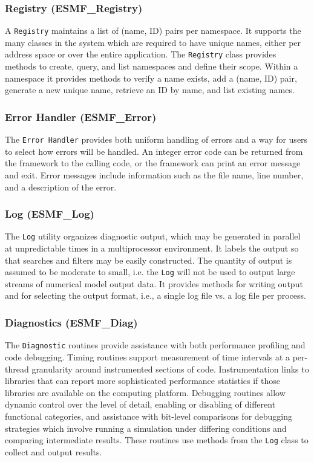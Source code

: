 \subsubsection{Registry (ESMF\_Registry)}
\label{sec:registry} 
A {\tt Registry} maintains a list of (name, ID) pairs per 
namespace.  It supports the many classes in the system which are
required to have unique names, either per address space or over the entire
application.  The {\tt Registry} class provides methods to
create, query, and list namespaces and define their scope.  
Within a namespace it provides methods to
verify a name exists, add a (name, ID) pair,
generate a new unique name, retrieve an ID by name, 
and list existing names.

\subsubsection{Error Handler (ESMF\_Error)}
\label{sec:error} 
The {\tt Error Handler} provides both uniform handling of errors and
a way for users to select how errors will be handled.
An integer error code can be returned from the framework to the
calling code, or the framework can print an error message and exit.
Error messages include information such as the file name, line number, 
and a description of the error.

\subsubsection{Log (ESMF\_Log)}
\label{sec:log} 
The {\tt Log} utility organizes diagnostic output, 
which may be generated in parallel at unpredictable times in
a multiprocessor environment.  It labels the output so that 
searches and filters may be easily constructed.  The quantity of
output is assumed to be moderate to small, i.e. the {\tt Log} 
will not be used to output large streams of numerical model output data.  
It provides methods for writing output and for selecting the
output format, i.e., a single log file vs. a log file per process.

\subsubsection{Diagnostics (ESMF\_Diag)}
\label{sec:diagnostics} 
The {\tt Diagnostic} routines provide assistance with both performance
profiling and code debugging.  Timing routines support measurement
of time intervals at a per-thread granularity around instrumented
sections of code.  Instrumentation links to libraries that can report 
more sophisticated performance statistics if those libraries are available 
on the computing platform.  Debugging routines allow dynamic control over the level
of detail, enabling or disabling of different functional categories,
and assistance with bit-level comparisons for debugging strategies which 
involve running a simulation under differing conditions and
comparing intermediate results.  These routines use methods from
the {\tt Log} class to collect and output results.








